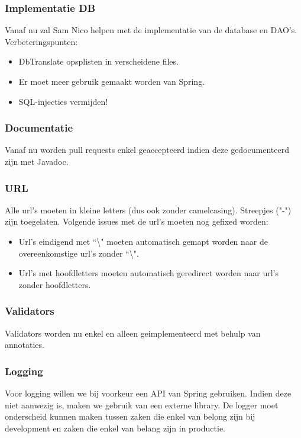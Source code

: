 \subsubsection{Implementatie DB}
Vanaf nu zal Sam Nico helpen met de implementatie van de database en DAO's. Verbeteringspunten: 
\begin{itemize}
	\item DbTranslate opsplisten in verscheidene files.
	\item Er moet meer gebruik gemaakt worden van Spring.
	\item SQL-injecties vermijden!
\end{itemize}
\subsubsection{Documentatie}
Vanaf nu worden pull requests enkel geaccepteerd indien deze gedocumenteerd zijn met Javadoc.

\subsubsection{URL}
Alle url's moeten in kleine letters (dus ook zonder camelcasing). Streepjes ("-") zijn toegelaten. Volgende issues met de url's moeten nog gefixed worden:
\begin{itemize}
	\item Url's eindigend met ``\textbackslash " moeten automatisch gemapt worden naar de overeenkomstige url's zonder ``\textbackslash ".
	\item Url's met hoofdletters moeten automatisch geredirect worden naar url's zonder hoofdletters.
\end{itemize}

\subsubsection{Validators}
Validators worden nu enkel en alleen geimplementeerd met behulp van annotaties.

\subsubsection{Logging} \label{sec:logging}
Voor logging willen we bij voorkeur een API van Spring gebruiken. Indien deze niet aanwezig is, maken we gebruik van een externe library. De logger moet onderscheid kunnen maken tussen zaken die enkel van belong zijn bij development en zaken die enkel van belang zijn in productie.

